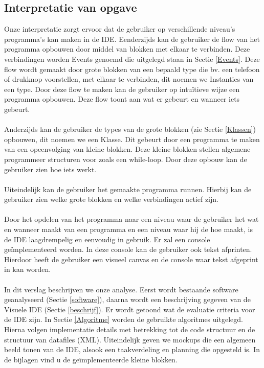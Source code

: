 \documentclass[]{article}
\begin{document}
\subsection{Interpretatie van opgave}
\label{interpretatie}
Onze interpretatie zorgt ervoor dat de gebruiker op verschillende niveau's programma's kan maken in de IDE. Eenderzijds kan de gebruiker de flow van het programma opbouwen door middel van blokken met elkaar te verbinden. Deze verbindingen worden Events genoemd die uitgelegd staan in Sectie \ref{Events}. Deze flow wordt gemaakt door grote blokken van een bepaald type die bv. een telefoon of drukknop voorstellen, met elkaar te verbinden, dit noemen we Instanties van een type. Door deze flow te maken kan de gebruiker op intu\"{i}tieve wijze een programma opbouwen. Deze flow toont aan wat er gebeurt en wanneer iets gebeurt. \\\\
Anderzijds kan de gebruiker de types van de grote blokken (zie Sectie \ref{Klassen}) opbouwen, dit noemen we een Klasse. Dit gebeurt door een programma te maken van een opeenvolging van kleine blokken. Deze kleine blokken stellen algemene programmeer structuren voor zoals een while-loop. Door deze opbouw kan de gebruiker zien hoe iets werkt. \\\\
Uiteindelijk kan de gebruiker het gemaakte programma runnen. Hierbij kan de gebruiker zien welke grote blokken en welke verbindingen actief zijn. \\\\ Door het opdelen van het programma naar een niveau waar de gebruiker het wat en wanneer maakt van een programma en een niveau waar hij de hoe maakt, is de IDE laagdrempelig en eenvoudig in gebruik. Er zal een console ge\"{i}mplementeerd worden. In deze console kan de gebruiker ook tekst afprinten. Hierdoor heeft de gebruiker een visueel canvas en de console waar tekst afgeprint in kan worden.\\\\ 
In dit verslag beschrijven we onze analyse. Eerst wordt bestaande software geanalyseerd (Sectie \ref{software}), daarna wordt een beschrijving gegeven van de Visuele IDE (Sectie \ref{beschrijf}). Er wordt getoond wat de evaluatie criteria voor de IDE zijn. In Sectie \ref{Algoritme} worden de gebruikte algoritmes uitgelegd. Hierna volgen implementatie details met betrekking tot de code structuur en de structuur van datafiles (XML). Uiteindelijk geven we mockups die een algemeen beeld tonen van de IDE, alsook een taakverdeling en planning die opgesteld is. In de bijlagen vind u de ge\"{i}mplementeerde kleine blokken.
\end{document}
